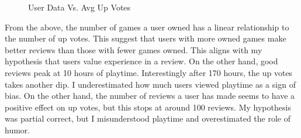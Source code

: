 \begin{figure}[H]
    \centering
    \caption{User Data Vs. Avg Up Votes}
\end{figure}

From the above, the number of games a user owned has a linear relationship to the number of up votes. This suggest that users with more owned games make better reviews than those with fewer games owned. This aligns with my hypothesis that users value experience in a review. On the other hand, good reviews peak at 10 hours of playtime. Interestingly after 170 hours, the up votes takes another dip. I underestimated how much users viewed playtime as a sign of bias. On the other hand, the number of reviews a user has made seems to have a positive effect on up votes, but this stops at around 100 reviews. My hypothesis was partial correct, but I misunderstood playtime and overestimated the role of humor. 
